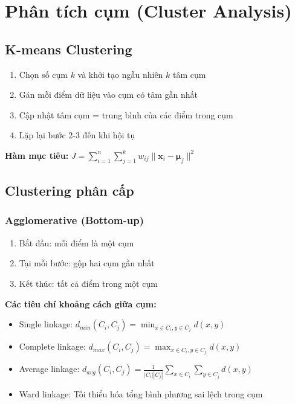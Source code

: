 \section{Phân tích cụm (Cluster Analysis)}

\subsection{K-means Clustering}
\begin{dl}
\begin{enumerate}
    \item Chọn số cụm $k$ và khởi tạo ngẫu nhiên $k$ tâm cụm
    \item Gán mỗi điểm dữ liệu vào cụm có tâm gần nhất
    \item Cập nhật tâm cụm = trung bình của các điểm trong cụm
    \item Lặp lại bước 2-3 đến khi hội tụ
\end{enumerate}
\end{dl}

\textbf{Hàm mục tiêu:} $J = \sum_{i=1}^n \sum_{j=1}^k w_{ij}\|\mathbf{x}_i - \boldsymbol{\mu}_j\|^2$

\subsection{Clustering phân cấp}
\subsubsection*{Agglomerative (Bottom-up)}
\begin{enumerate}
    \item Bắt đầu: mỗi điểm là một cụm
    \item Tại mỗi bước: gộp hai cụm gần nhất
    \item Kết thúc: tất cả điểm trong một cụm
\end{enumerate}

\textbf{Các tiêu chí khoảng cách giữa cụm:}
\begin{itemize}
    \item Single linkage: $d_{min}(C_i, C_j) = \min_{x \in C_i, y \in C_j} d(x,y)$
    \item Complete linkage: $d_{max}(C_i, C_j) = \max_{x \in C_i, y \in C_j} d(x,y)$
    \item Average linkage: $d_{avg}(C_i, C_j) = \frac{1}{|C_i||C_j|}\sum_{x \in C_i}\sum_{y \in C_j} d(x,y)$
    \item Ward linkage: Tối thiểu hóa tổng bình phương sai lệch trong cụm
\end{itemize}

